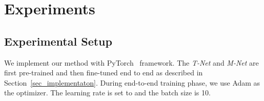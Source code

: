 \begin{comment}
Where ,  and  is a weight that balanced these three loss and is set to 0.5, 0.5 and 1.0 in this paper.

\textbf{Implementation details:} We first initialize the weights of the entire network with the pretrained T-Net and M-Net. Then we finetune the entire network on our human matting training dataset. We combine the data augmentation used in the pretraining stage of T-Net and M-Net and predict the finally alpha mattes as  follows:

1. The input images with corresponding alpha mattes and trimap ground truths are resized, cropped, rotated and flipped by the same parameters described in Trimap generation stage. T-Net takes these large image patches (800x800) as inputs and predicts the trimaps.

2.  three types of small image patches (320x320, 480x480 and 640x640) are randomly cropped from the above large image patches that ensure the center of the cropped small patches are in the unknown regions of trimaps. Then all these small image patches are resized to 320x320 and then are feed to the M-Net as inputs. We record the information of the small image patches with respect to the large image patches, such as locations, resize scales and flipping. These informations are used to recover the trimaps predicted by T-Net corresponding to the small image patches. M-Net takes these small patches with the corresponding predicted trimaps as inputs and outputs the raw alpha mattes.

3. T-M fusion layer takes the predicted trimaps and raw alpha mattes of the small image patches as inputs and outputs final alpha mattes. we compute alpha predict loss  and compositional loss  on the small image patches, while trimap cross entropy loss  on the large image patches.

We use adam as our optimizer and set the learning rate to  unchanged during the end to end training.

\end{comment}


\section{Experiments}

\subsection{Experimental Setup}

We implement our method with PyTorch~\cite{paszke2017automatic} framework.
The \emph{T-Net} and \emph{M-Net} are first pre-trained and then fine-tuned end to end as described in Section~\ref{sec_implementaton}.
During end-to-end training phase,  we use Adam as the optimizer.
The learning rate is set to  and the batch size is 10.

